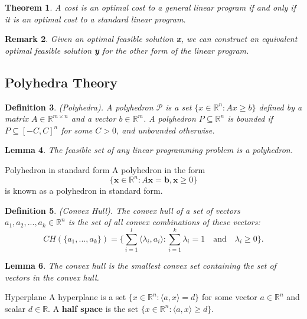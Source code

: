 \documentclass[twoside]{article}
\newcounter{lecnum}
\newtheorem{theorem}{Theorem}[lecnum]
\newtheorem{lemma}[theorem]{Lemma}
\newtheorem{definition}[theorem]{Definition}
\newtheorem{remark}[theorem]{Remark}
\begin{document}
\begin{theorem}A cost is an optimal cost to a general linear program if and only if it is an optimal cost to a standard linear  program.
\end{theorem}

\begin{remark}Given an optimal feasible solution \textbf{x}, we can construct an equivalent optimal feasible solution \textbf{y} for the other form of the linear program.
\end{remark}

\subsection{Polyhedra Theory}
\begin{definition}(Polyhedra). A polyhedron $\mathcal{P}$ is a set $\{x \in \mathbb{R}^n: Ax \geq b\}$ defined by a matrix $A \in \mathbb{R}^{m \times n}$ and a vector $b \in \mathbb{R}^m$. A polyhedron $P \subseteq \mathbb{R}^n$ is bounded if $P \subseteq [-C,C]^n$ for some $C > 0$, and unbounded otherwise.
\end{definition}

\begin{lemma}The feasible set of any linear programming problem is a polyhedron.
\end{lemma}
\begin{definition_exam}{Polyhedron in standard form}{} A polyhedron in the form 
$$
\{\textbf{x}\in \mathbb{R}^n: A\textbf{x} = \textbf{b}, \textbf{x} \geq 0\}
$$
is known as a polyhedron in standard form.
\end{definition_exam}

\begin{definition}(Convex Hull). The convex hull of a set of vectors $a_1,a_2,...,a_k \in \mathbb{R}^n$ is the set of all convex combinations of these vectors:
$$
CH(\{a_1,...,a_k\}) = \{\sum_{i=1}^l\langle \lambda_i, a_i \rangle: \sum_{i=1}^k\lambda_i=1 \quad \text{and} \quad \lambda_i \geq 0\}.
$$
\end{definition}

\begin{lemma}The convex hull is the smallest convex set containing the set of vectors in the convex hull.
\end{lemma}

\begin{definition_exam}{Hyperplane}{} A hyperplane is a set $\{x \in \mathbb{R}^n: \langle a, x\rangle = d\}$ for some vector $a \in \mathbb{R}^n$ and scalar $d \in \mathbb{R}$. A \textbf{half space} is the set $\{x \in \mathbb{R}^n: \langle a, x\rangle \geq d\}$.
\end{definition_exam}
\end{document}

